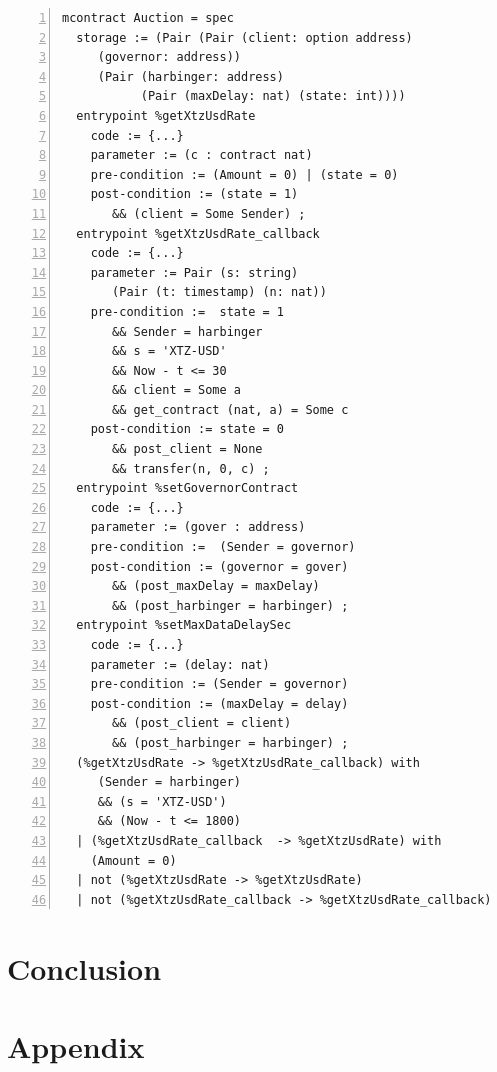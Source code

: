\documentclass[a4paper,UKenglish,cleveref, autoref, thm-restate]{lipics-v2021}
\begin{document}
\begin{lstlisting}[float,captionpos=b,caption={Kolibri oracle contract specification},label={lst:kolibri-contract-specification},numbers=left]
mcontract Auction = spec 
  storage := (Pair (Pair (client: option address) 
     (governor: address))
     (Pair (harbinger: address) 
           (Pair (maxDelay: nat) (state: int))))
  entrypoint %getXtzUsdRate
    code := {...}
    parameter := (c : contract nat) 
    pre-condition := (Amount = 0) | (state = 0)
    post-condition := (state = 1) 
       && (client = Some Sender) ;
  entrypoint %getXtzUsdRate_callback
    code := {...}
    parameter := Pair (s: string) 
       (Pair (t: timestamp) (n: nat))
    pre-condition :=  state = 1 
       && Sender = harbinger  
       && s = 'XTZ-USD' 
       && Now - t <= 30 
       && client = Some a 
       && get_contract (nat, a) = Some c    
    post-condition := state = 0 
       && post_client = None 
       && transfer(n, 0, c) ;
  entrypoint %setGovernorContract
    code := {...}
    parameter := (gover : address) 
    pre-condition :=  (Sender = governor)                  
    post-condition := (governor = gover) 
       && (post_maxDelay = maxDelay) 
       && (post_harbinger = harbinger) ;
  entrypoint %setMaxDataDelaySec
    code := {...}
    parameter := (delay: nat)
    pre-condition := (Sender = governor)             
    post-condition := (maxDelay = delay) 
       && (post_client = client) 
       && (post_harbinger = harbinger) ;
  (%getXtzUsdRate -> %getXtzUsdRate_callback) with
     (Sender = harbinger)
     && (s = 'XTZ-USD') 
     && (Now - t <= 1800)  
  | (%getXtzUsdRate_callback  -> %getXtzUsdRate) with 
    (Amount = 0) 
  | not (%getXtzUsdRate -> %getXtzUsdRate) 
  | not (%getXtzUsdRate_callback -> %getXtzUsdRate_callback)
\end{lstlisting}
\section {Conclusion}
\section {Appendix}
\end{document}
